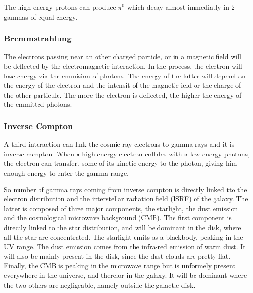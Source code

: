 The high energy protons can produce $\pi^{0}$ which decay almost immediatly in 2 gammas of equal energy.




\subsubsection{Bremmstrahlung}


The electrons passing near an other charged particle, or in a magnetic field will be deflected by the electromagnetic interaction. In the process, the electron will lose energy via the emmision of photons. The energy of the latter will depend on the energy of the electron and the intensit of the magnetic ield or the charge of the other particule. The more the electron is deflected, the higher the energy of the emmitted photons.


\subsubsection{Inverse Compton}


A third interaction can link the cosmic ray electrons to gamma rays and it is inverse compton. When a high energy electron collides with a low energy photons, the electron can transfert some of its kinetic energy to the photon, giving him enough energy to enter the gamma range.

So number of gamma rays coming from inverse compton is directly linked tto the electron distribution and the interstellar radiation field (ISRF) of the galaxy. The latter is composed of three major components, the starlight, the dust emission and the cosmological microwave background (CMB). The first component is directly linked to the star distribution, and will be dominant in the disk, where all the star are concentrated. The starlight emits as a blackbody, peaking in the UV range. The dust emission comes from the infra-red emission of warm dust. It will also be mainly present in the disk, since the dust clouds are pretty flat. Finally, the CMB is peaking in the microwave range but is unformely present everywhere in the universe, and therefor in the galaxy. It will be dominant where the two others are negligeable, namely outside the galactic disk.




